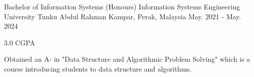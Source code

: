 

\begin{cventries}

  \cventry
    {Bachelor of Information Systems (Honours) Information Systems Engineering} %
    {University Tunku Abdul Rahman} %
    {Kampar, Perak, Malaysia} %
    {May. 2021 - May. 2024} %
    {
      \begin{cvitems} %
        \item {3.0 CGPA}
        \item {Obtained an A- in "Data Structure and Algorithmic Problem Solving" which is a course introducing students to data structure and algorithms.}
      \end{cvitems}
    }
\end{cventries}
